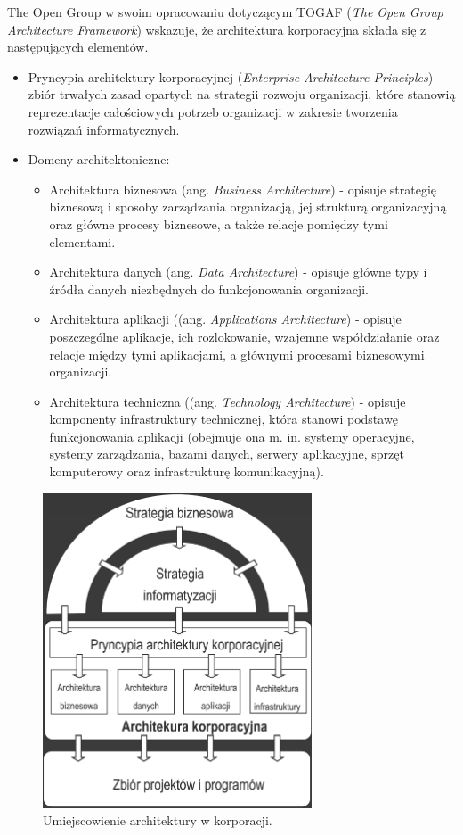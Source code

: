 The Open Group w swoim opracowaniu dotyczącym TOGAF (\emph{The Open Group Architecture Framework}) wskazuje, że architektura korporacyjna składa się z następujących elementów.
\begin{itemize}
\item{Pryncypia architektury korporacyjnej (\emph{Enterprise Architecture Principles}) - zbiór trwałych zasad opartych na strategii rozwoju organizacji, które stanowią reprezentacje całościowych potrzeb organizacji w zakresie tworzenia rozwiązań informatycznych.}
\item{Domeny architektoniczne:
\begin{itemize}
\item{Architektura biznesowa (ang. \emph{Business Architecture}) - opisuje strategię biznesową i sposoby zarządzania organizacją, jej strukturą organizacyjną oraz główne procesy biznesowe, a także relacje pomiędzy tymi elementami.}
\item{Architektura danych (ang. \emph{Data Architecture}) - opisuje główne typy i źródła danych niezbędnych do funkcjonowania organizacji.}
\item{Architektura aplikacji ((ang. \emph{Applications Architecture}) - opisuje poszczególne aplikacje, ich rozlokowanie, wzajemne współdziałanie oraz relacje między tymi aplikacjami, a głównymi procesami biznesowymi organizacji.}
\item{Architektura techniczna ((ang. \emph{Technology Architecture}) - opisuje komponenty infrastruktury technicznej, która stanowi podstawę funkcjonowania aplikacji (obejmuje ona m. in. systemy operacyjne, systemy zarządzania, bazami danych, serwery aplikacyjne, sprzęt komputerowy oraz infrastrukturę komunikacyjną).}
\end{itemize}
}
\end{itemize}

\begin{figure}[h!tbp]
\begin{centering}
\includegraphics[width=8cm]{img/ea.png}
\caption[Umiejscowienie architektury w korporacji.]{Umiejscowienie architektury w korporacji. \cite{SOMAArsIBMJour}}\label{ea_arch}
\end{centering}
\end{figure}

